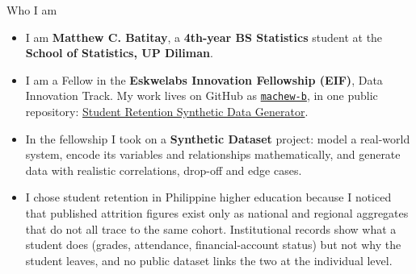 \documentclass[aspectratio=169,11pt,t]{beamer}
\newcommand{\repo}{https://github.com/machew-b/Student-Retention-Synthetic-Data-Generator}
\newcommand{\gh}[2]{\href{\repo/#1}{#2}}
\begin{document}
\begin{frame}{Who I am}
  \begin{itemize}
    \item I am \textbf{Matthew C. Batitay}, a \textbf{4th-year BS Statistics} student at the
          \textbf{School of Statistics, UP Diliman}.
    \item I am a Fellow in the \textbf{Eskwelabs Innovation Fellowship (EIF)}, Data
          Innovation Track. My work lives on GitHub as
          \href{https://github.com/machew-b}{\texttt{machew-b}}, in one public
          repository: \gh{}{Student Retention Synthetic Data Generator}.
    \item In the fellowship I took on a \textbf{Synthetic Dataset} project: model a
          real-world system, encode its variables and relationships
          mathematically, and generate data with realistic correlations,
          drop-off and edge cases.
        \item I chose \alert{student retention in Philippine higher education} because I noticed that published attrition figures exist only as
          national and regional aggregates that do not all trace to the same cohort.
          Institutional records show what a student does (grades, attendance,
          financial-account status) but not why the student leaves, and no public
          dataset links the two at the individual level.
  \end{itemize}
\end{frame}
\end{document}
